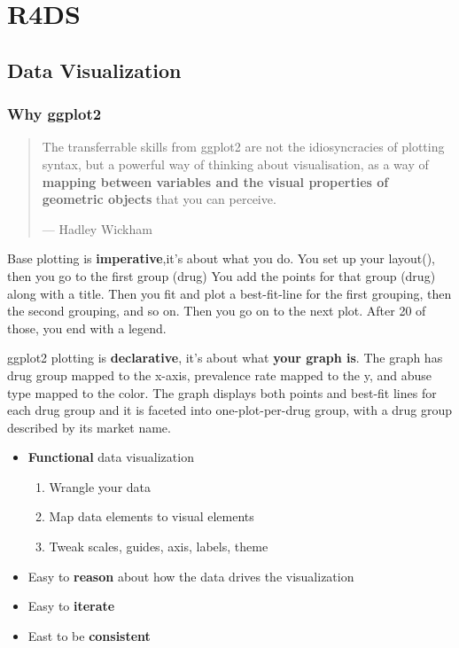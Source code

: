 \documentclass[]{book}
\providecommand{\tightlist}{%
  \setlength{\itemsep}{0pt}\setlength{\parskip}{0pt}}
\theoremstyle{definition}
\theoremstyle{definition}
\theoremstyle{definition}
\theoremstyle{remark}
\begin{document}
\part{R4DS}\label{part-r4ds}

\chapter{Data Visualization}\label{data-visualization}

\section{Why ggplot2}\label{why-ggplot2}

\begin{quote}
The transferrable skills from ggplot2 are not the idiosyncracies of
plotting syntax, but a powerful way of thinking about visualisation, as
a way of \textbf{mapping between variables and the visual properties of
geometric objects} that you can perceive.

--- Hadley Wickham
\end{quote}

Base plotting is \textbf{imperative},it's about what you do. You set up
your layout(), then you go to the first group (drug) You add the points
for that group (drug) along with a title. Then you fit and plot a
best-fit-line for the first grouping, then the second grouping, and so
on. Then you go on to the next plot. After 20 of those, you end with a
legend.

ggplot2 plotting is \textbf{declarative}, it's about what \textbf{your
graph is}. The graph has drug group mapped to the x-axis, prevalence
rate mapped to the y, and abuse type mapped to the color. The graph
displays both points and best-fit lines for each drug group and it is
faceted into one-plot-per-drug group, with a drug group described by its
market name.

\begin{itemize}
\tightlist
\item
  \textbf{Functional} data visualization

  \begin{enumerate}
  \def\labelenumi{\arabic{enumi}.}
  \tightlist
  \item
    Wrangle your data
  \item
    Map data elements to visual elements
  \item
    Tweak scales, guides, axis, labels, theme
  \end{enumerate}
\item
  Easy to \textbf{reason} about how the data drives the visualization
\item
  Easy to \textbf{iterate}
\item
  East to be \textbf{consistent}
\end{itemize}
\end{document}
